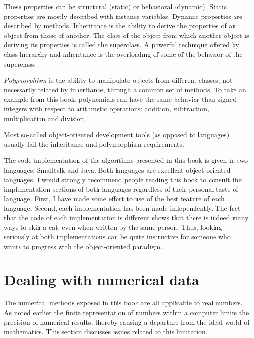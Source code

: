 \documentclass[twoside]{book}
\begin{document}
These properties can be structural (static) or behavioral
(dynamic). Static properties are mostly described with instance
variables. Dynamic properties are described by methods.
Inheritance is the ability to derive the properties of an object
from those of another. The class of the object from which another
object is deriving its properties is called the superclass. A
powerful technique offered by class hierarchy and inheritance is
the overloading of some of the behavior of the superclass.
\par
{\it Polymorphism} is the ability to manipulate objects from
different classes, not necessarily related by inheritance, through
a common set of methods. To take an example from this book,
polynomials can have the same behavior than signed integers with
respect to arithmetic operations: addition, subtraction,
multiplication and division.
\par
Most so-called object-oriented development tools (as opposed to
languages) usually fail the inheritance and polymorphism
requirements.
\par
The code implementation of the algorithms presented in this book
is given in two languages: Smalltalk and Java. Both languages are
excellent object-oriented languages. I would strongly recommend
people reading this book to consult the implementation sections of
both languages regardless of their personal taste of language.
First, I have made some effort to use of the best feature of each
language. Second, each implementation has been made independently.
The fact that the code of each implementation is different shows
that there is indeed many ways to skin a cat, even when written by
the same person. Thus, looking seriously at both implementations
can be quite instructive for someone who wants to progress with
the object-oriented paradigm.

\section{Dealing with numerical data}
The numerical methods exposed in this book are all applicable to
real numbers. As noted earlier the finite representation of
numbers within a computer limits the precision of numerical
results, thereby causing a departure from the ideal world of
mathematics. This section discusses issues related to this
limitation.
\end{document}
